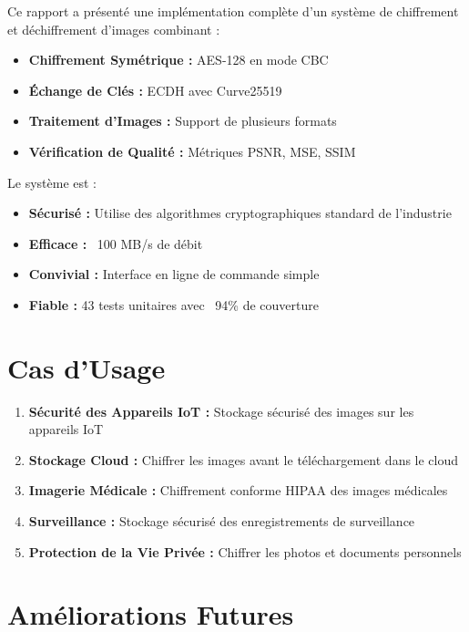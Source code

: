\documentclass[12pt,a4paper]{report}
\begin{document}
Ce rapport a présenté une implémentation complète d'un système de chiffrement et déchiffrement d'images combinant :

\begin{itemize}
    \item \textbf{Chiffrement Symétrique :} AES-128 en mode CBC
    \item \textbf{Échange de Clés :} ECDH avec Curve25519
    \item \textbf{Traitement d'Images :} Support de plusieurs formats
    \item \textbf{Vérification de Qualité :} Métriques PSNR, MSE, SSIM
\end{itemize}

Le système est :
\begin{itemize}
    \item \textbf{Sécurisé :} Utilise des algorithmes cryptographiques standard de l'industrie
    \item \textbf{Efficace :} ~100 MB/s de débit
    \item \textbf{Convivial :} Interface en ligne de commande simple
    \item \textbf{Fiable :} 43 tests unitaires avec ~94\% de couverture
\end{itemize}

\section{Cas d'Usage}

\begin{enumerate}
    \item \textbf{Sécurité des Appareils IoT :} Stockage sécurisé des images sur les appareils IoT
    \item \textbf{Stockage Cloud :} Chiffrer les images avant le téléchargement dans le cloud
    \item \textbf{Imagerie Médicale :} Chiffrement conforme HIPAA des images médicales
    \item \textbf{Surveillance :} Stockage sécurisé des enregistrements de surveillance
    \item \textbf{Protection de la Vie Privée :} Chiffrer les photos et documents personnels
\end{enumerate}

\section{Améliorations Futures}
\end{document}
